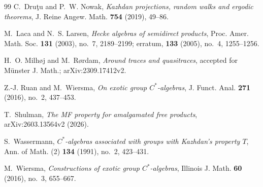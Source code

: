 \documentclass[11pt]{article}
\begin{document}
\begin{thebibliography}{99}
C.~Dru\c tu and P.~W. Nowak,
\emph{Kazhdan projections, random walks and ergodic theorems},
J. Reine Angew. Math. \textbf{754} (2019), 49--86.

M.~Laca and N.~S. Larsen,
\emph{Hecke algebras of semidirect products},
Proc. Amer. Math. Soc. \textbf{131} (2003), no.~7, 2189--2199;
erratum, \textbf{133} (2005), no.~4, 1255--1256.

H.~O. Milh\o j and M.~R\o rdam,
\emph{Around traces and quasitraces},
accepted for M\"unster J. Math.; arXiv:2309.17412v2.

Z.-J. Ruan and M.~Wiersma,
\emph{On exotic group $C^*$-algebras},
J. Funct. Anal. \textbf{271} (2016), no.~2, 437--453.

T.~Shulman,
\emph{The MF property for amalgamated free products},
arXiv:2603.13564v2 (2026).

S.~Wassermann,
\emph{$C^*$-algebras associated with groups with Kazhdan's property $T$},
Ann. of Math. (2) \textbf{134} (1991), no.~2, 423--431.

M.~Wiersma,
\emph{Constructions of exotic group $C^*$-algebras},
Illinois J. Math. \textbf{60} (2016), no.~3, 655--667.

\end{thebibliography}
\end{document}
